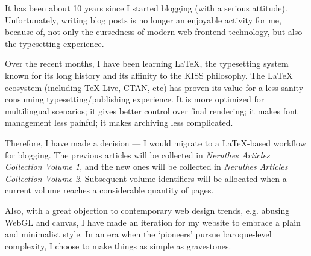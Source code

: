 
It has been about 10 years since I started blogging (with a serious attitude).
Unfortunately, writing blog posts is no longer an enjoyable activity for me,
because of, not only the cursedness of modern web frontend technology,
but also the typesetting experience.

Over the recent months, I have been learning \LaTeX{},
the typesetting system known for its long history and its affinity to the KISS philosophy.
The \LaTeX{} ecosystem (including \TeX{} Live, CTAN, etc)
has proven its value for a less sanity-consuming typesetting/publishing experience.
It is more optimized for multilingual scenarios; it gives better control over final rendering;
it makes font management less painful; it makes archiving less complicated.

Therefore, I have made a decision ---
I would migrate to a \LaTeX{}-based workflow for blogging.
The previous articles will be collected in \textit{Neruthes Articles Collection Volume 1},
and the new ones will be collected in \textit{Neruthes Articles Collection Volume 2}.
Subsequent volume identifiers will be allocated when a current volume reaches a considerable quantity of pages.

Also, with a great objection to contemporary web design trends,
e.g. abusing WebGL and canvas,
I have made an iteration for my website to embrace a plain and minimalist style.
In an era when the `pioneers' pursue baroque-level complexity,
I choose to make things as simple as gravestones.
